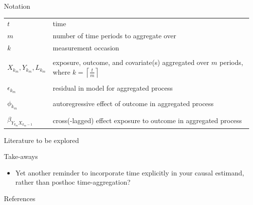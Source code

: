 \documentclass[aspectratio=169, xcolor=dvipsnames]{beamer} %
\newcommand{\ceil}[1]{\left\lceil #1 \right\rceil}
\begin{document}
\begin{frame}{Notation}
    \begin{table}[]
        \centering
        \footnotesize
        \begin{tabular}{p{2cm}p{11cm}}
            $t$ & time \\
            $m$ & number of time periods to aggregate over\\
            $k$ & measurement occasion \\
            & \\
            $X_{k_{m}}, Y_{k_{m}}, L_{k_{m}}$ & exposure, outcome, and covariate(s) aggregated over $m$ periods, where $k = \ceil{\frac{t}{m}}$\\
                & \\
            $\epsilon_{k_{m}}$ & residual in model for aggregated process\\
            & \\
            $\phi_{k_{m}}$ & autoregressive effect of outcome in aggregated process\\
            & \\
            $\beta_{Y_{k_{m}}X_{k_{m} - 1}}$ & cross(-lagged) effect exposure to outcome in aggregated process\\
        \end{tabular}
    \end{table}
\end{frame}


\begin{frame}{Literature to be explored}
    
\end{frame}


\begin{frame}{Take-aways}
    \begin{itemize}
        \item Yet another reminder to incorporate time explicitly in your causal estimand, rather than posthoc time-aggregation? 
        
    \end{itemize}
\end{frame}


\begin{frame}{References}
    \printbibliography
\end{frame}
    
\end{document}

